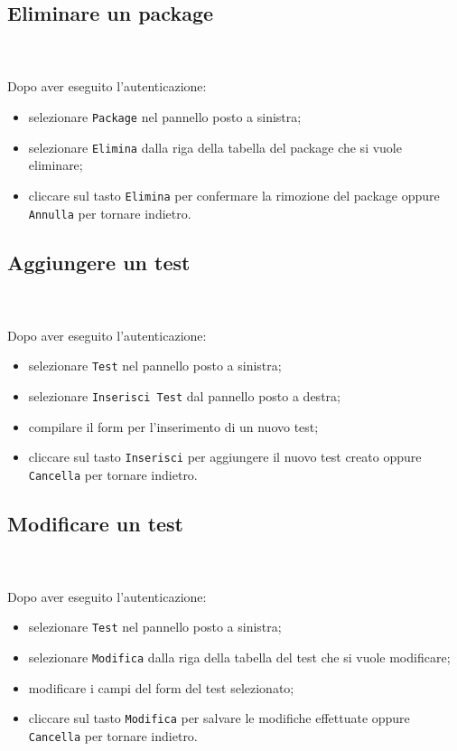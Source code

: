 	\subsection{Eliminare un package} \mbox{}\\ \mbox{}\\
	Dopo aver eseguito l'autenticazione:
	\begin{itemize}
		\item selezionare \texttt{Package} nel pannello posto a sinistra;
		\item selezionare \texttt{Elimina} dalla riga della tabella del package 
		che si vuole eliminare;\
		\item cliccare sul tasto \texttt{Elimina} per confermare la rimozione 
		del package
		oppure \texttt{Annulla} per tornare indietro.
	\end{itemize}
	
	\subsection{Aggiungere un test} \mbox{}\\ \mbox{}\\
	Dopo aver eseguito l'autenticazione:
	\begin{itemize}
		\item selezionare \texttt{Test} nel pannello posto a sinistra;
		\item selezionare \texttt{Inserisci Test} dal pannello posto a destra;
		\item compilare il form per l'inserimento di un nuovo test;
		\item cliccare sul tasto \texttt{Inserisci} per aggiungere il nuovo test
		creato oppure \texttt{Cancella} per tornare indietro.	
	\end{itemize}
	
	\subsection{Modificare un test} \mbox{}\\ \mbox{}\\
	Dopo aver eseguito l'autenticazione:
	\begin{itemize}
		\item selezionare \texttt{Test} nel pannello posto a sinistra;
		\item selezionare \texttt{Modifica} dalla riga della tabella del test
		che si vuole modificare;
		\item modificare i campi del form del test selezionato;
		\item cliccare sul tasto \texttt{Modifica} per salvare le modifiche 
		effettuate
		oppure \texttt{Cancella} per tornare indietro.
	\end{itemize}
	
